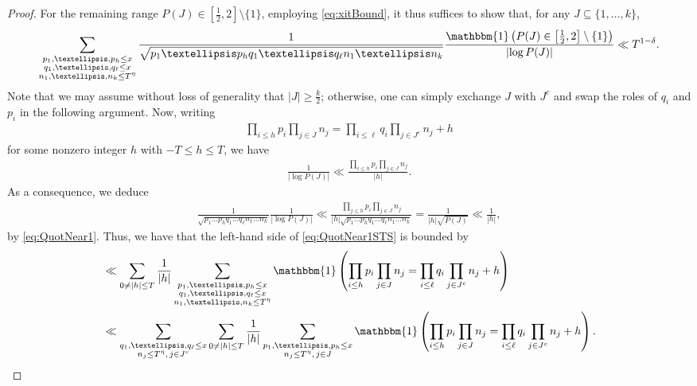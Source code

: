 \documentclass[10pt,a4paper]{amsart}
\begin{document}
\begin{proof}
    For the remaining range $P(J)\in[\frac12,2] \setminus \{ 1 \}$, employing \eqref{eq:xitBound}, it thus suffices to show that, for any $J \subseteq \{1,\dots,k\}$,
    \begin{equation}\label{eq:QuotNear1STS} 
        \sum_{\substack{p_1, \dots, p_h  \leq x\\ q_1, \dots, q_\ell\leq x \\ n_1, \dots, n_k \le T^\eta}} 
        \frac{1}{\sqrt{p_1\dots p_h q_1\dots q_\ell n_1\dots n_k}} \frac{\mathbbm{1} \left( P(J) \in \left[ \tfrac{1}{2}, 2 \right] \setminus \{1 \}  \right)}{\left| \log P(J) \right|}  
        \ll T^{1-\delta}.
    \end{equation}
    Note that we may assume without loss of generality that $|J| \ge \frac{k}{2}$; otherwise, one can simply exchange $J$ with $J^c$ and swap the roles of $q_i$ and $p_i$ in the following argument. 
    Now, writing
    \begin{align}\label{eq:shiftbyh}
        \prod_{i\leq h} p_i \prod_{j\in J} n_j=\prod_{i\leq \ell} q_i \prod_{j\in J^c} n_j +h
    \end{align}
    for some nonzero integer $h$ with $-T\leq h\leq T$, we have
    \begin{align*}
        \frac{1}{\vert \log P(J)\vert}\ll \frac{\prod_{i\leq h} p_i \prod_{j\in J} n_j}{\vert h\vert}.
    \end{align*}
    As a consequence, we deduce
    \begin{align*}
        \frac{1}{\sqrt{p_1\dots p_h q_1\dots q_\ell n_1\dots n_k}} \frac{1}{\left| \log P(J) \right|} 
        \ll  \frac{\prod_{j\leq h} p_i \prod_{j\in J} n_j}{|h|\sqrt{p_1\dots p_h q_1\dots q_\ell n_1\dots n_k}} 
        = \frac{1}{|h|\sqrt{P(J)}} 
        \ll \frac{1}{|h|}  ,
    \end{align*}
    by \eqref{eq:QuotNear1}. Thus, we have that the left-hand side of \eqref{eq:QuotNear1STS} is bounded by
    \begin{align*}
        &\ll \sum_{0\neq |h| \leq T} \frac{1}{|h|} \sum_{\substack{p_1, \dots, p_h  \leq x\\ q_1, \dots, q_\ell\leq x \\ n_1, \dots, n_k  \leq T^\eta}} \mathbbm{1} \left( \prod_{i\leq h} p_i \prod_{j\in J} n_j = \prod_{i\leq \ell} q_i \prod_{j\in J^c} n_j+h \right)\\
        &\ll \sum_{\substack{q_1,\dots,q_\ell \leq x \\ n_j\leq T^\eta,\, j\in J^c}}  \sum_{0\neq |h| \leq T} \frac{1}{|h|} \sum_{\substack{p_1, \dots, p_h  \leq x \\ n_j \leq T^\eta, \, j\in J}} \mathbbm{1} \left( \prod_{i\leq h} p_i \prod_{j\in J} n_j = \prod_{i\leq \ell} q_i \prod_{j\in J^c} n_j+h \right).

\end{align*}
\end{proof}
\end{document}
